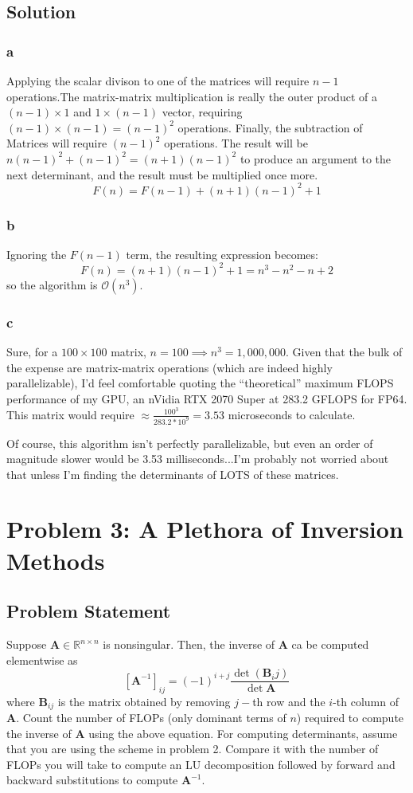\documentclass[11pt]{report}
\theoremstyle{definition}
\newcommand{\mat}[1]{\mathbf{#1}}
\begin{document}
\subsection*{Solution}
\subsubsection*{a}
Applying the scalar divison to one of the matrices will require $n-1$
operations.The matrix-matrix multiplication is really the outer product of a
$(n-1)\times 1$ and $1\times(n-1)$ vector, requiring $(n-1)\times(n-1)=(n-1)^2$
operations. Finally, the subtraction of Matrices will require $(n-1)^2$ operations.
The result will be $n(n-1)^2+(n-1)^2=(n+1)(n-1)^2$ to produce an argument to the
next determinant, and the result must be multiplied once more.
\[ F(n) = F(n-1) + (n+1)(n-1)^2 + 1 \]

\subsubsection*{b}
Ignoring the $F(n-1)$ term, the resulting expression becomes:
\[F(n) = (n+1)(n-1)^2+1 = n^3-n^2-n+2\]
so the algorithm is $\mathcal{O}(n^3)$.

\subsubsection*{c}
Sure, for a $100\times100$ matrix, $n=100\implies n^3=1,000,000$. Given that
the bulk of the expense are matrix-matrix operations (which are indeed highly
parallelizable), I'd feel comfortable quoting the ``theoretical'' maximum FLOPS
performance of my GPU, an nVidia RTX 2070 Super at 283.2 GFLOPS for FP64.
This matrix would require $\approx \frac{100^3}{283.2*10^9}=3.53$ microseconds
to calculate.

Of course, this algorithm isn't perfectly parallelizable, but even an order of
magnitude slower would be 3.53 milliseconds...I'm probably not worried about
that unless I'm finding the determinants of LOTS of these matrices.

\newpage
\section*{Problem 3: A Plethora of Inversion Methods}
\subsection*{Problem Statement}
Suppose $\mat{A}\in\mathbb{R}^{n\times n}$ is nonsingular. Then, the inverse of
$\mat{A}$ ca be computed elementwise as
\[ \left[\mat{A}^{-1}\right]_{ij} = (-1)^{i+j}\frac{\det(\mat{B}_ij)}{\det{\mat{A}}} \]
where $\mat{B}_{ij}$ is the matrix obtained by removing $j-$th row and the
$i$-th column of $\mat{A}$. Count the number of FLOPs (only dominant terms of
$n$) required to compute the inverse of $\mat{A}$ using the above equation. For
computing determinants, assume that you are using the scheme in problem 2.
Compare it with the number of FLOPs you will take to compute an LU decomposition
followed by forward and backward substitutions to compute $\mat{A}^{-1}$.
\end{document}
